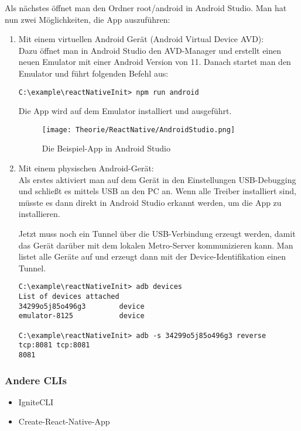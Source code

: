 Als nächstes öffnet man den Ordner root/android in Android Studio. Man hat nun zwei Möglichkeiten,
die App auszuführen:

\begin{enumerate}
  \item Mit einem virtuellen Android Gerät (Android Virtual Device AVD):\\
Dazu öffnet man in Android Studio den AVD-Manager und erstellt einen neuen Emulator mit einer
Android Version von 11. Danach startet man den Emulator und führt folgenden Befehl aus:

\begin{lstlisting}
C:\example\reactNativeInit> npm run android
\end{lstlisting}

Die App wird auf dem Emulator installiert und ausgeführt.

\begin{figure}[H]
  \begin{center}
    \texttt{[image: Theorie/ReactNative/AndroidStudio.png]}
    \caption{Die Beispiel-App in Android Studio}
  \end{center}
\end{figure}

  \item Mit einem physischen Android-Gerät:\\
Als erstes aktiviert man auf dem Gerät in den Einstellungen USB-Debugging und schließt es mittels
USB an den PC an. Wenn alle Treiber installiert sind, müsste es dann direkt in Android Studio
erkannt werden, um die App zu installieren.

Jetzt muss noch ein Tunnel über die USB-Verbindung erzeugt werden, damit das Gerät darüber mit dem
lokalen Metro-Server kommunizieren kann. Man listet alle Geräte auf und erzeugt dann mit der
Device-Identifikation einen Tunnel.

\begin{lstlisting}
C:\example\reactNativeInit> adb devices
List of devices attached
34299o5j85o496g3        device
emulator-8125           device

C:\example\reactNativeInit> adb -s 34299o5j85o496g3 reverse tcp:8081 tcp:8081
8081
\end{lstlisting}

\end{enumerate}

\subsubsection{Andere CLIs}
\begin{itemize}
  \item IgniteCLI \cite{ignitecli}
  \item Create-React-Native-App \cite{createReactNativeApp}
\end{itemize}
